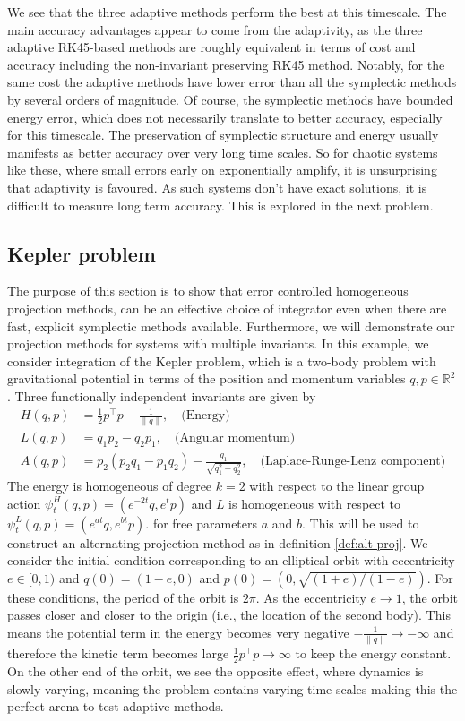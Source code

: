 \documentclass[final,3p,times]{elsarticle}
\newcommand{\R}{\mathbb{R}}
\begin{document}
We see that the three adaptive methods perform the best at this timescale. The main accuracy advantages appear to come from the adaptivity, as the three adaptive RK45-based methods are roughly equivalent in terms of cost and accuracy including the non-invariant preserving RK45 method. Notably, for the same cost the adaptive methods have lower error than all the symplectic methods by several orders of magnitude. Of course, the symplectic methods have bounded energy error, which does not necessarily translate to better accuracy, especially for this timescale. The preservation of symplectic structure and energy usually manifests as better accuracy over very long time scales. So for chaotic systems like these, where small errors early on exponentially amplify, it is unsurprising that adaptivity is favoured. As such systems don't have exact solutions, it is difficult to measure long term accuracy. This is explored in the next problem. 

\subsection{Kepler problem}
The purpose of this section is to show that error controlled homogeneous projection methods, can be an effective choice of integrator even when there are fast, explicit symplectic methods available. Furthermore, we will demonstrate our projection methods for systems with multiple invariants. In this example, we consider integration of the Kepler problem, which is a two-body problem with gravitational potential in terms of the position and momentum variables $q,p\in\R^2$. Three functionally independent invariants are given by
\begin{align}
    H(q,p) &= \frac{1}{2} p^\top p - \frac{1}{\|q\|},\quad\text{(Energy)}\\ 
    L(q,p) &= q_1 p_2 - q_2 p_1,\quad\text{(Angular momentum)}\\
    A(q,p) &= p_2(p_2q_1-p_1q_2) - \frac{q_1}{\sqrt{q_1^2 + q_2^2}}, \quad\text{(Laplace-Runge-Lenz component)}
\end{align}
The energy is homogeneous of degree $k=2$ with respect to the linear group action $\psi^H_t(q,p) = (e^{-2t}q, e^{t}p)$ and $L$ is homogeneous with respect to $\psi^L_t(q, p) = (e^{at}q, e^{bt}p)$.
for free parameters $a$ and $b$. This will be used to construct an alternating projection method as in definition \ref{def:alt proj}. We consider the initial condition corresponding to an elliptical orbit with eccentricity $e\in[0, 1)$ and  $q(0) = (1-e,0)$ and $p(0) = (0,\sqrt{(1+e)/(1-e)})$. For these conditions, the period of the orbit is $2\pi$. As the eccentricity $e\rightarrow 1$, the orbit passes closer and closer to the origin (i.e., the location of the second body). This means the potential term in the energy becomes very negative $-\frac{1}{\|q\|}\rightarrow -\infty$ and therefore the kinetic term becomes large $\frac{1}{2} p^\top p \rightarrow \infty$ to keep the energy constant. On the other end of the orbit, we see the opposite effect, where dynamics is slowly varying, meaning the problem contains varying time scales making this the perfect arena to test adaptive methods. 
\end{document}
